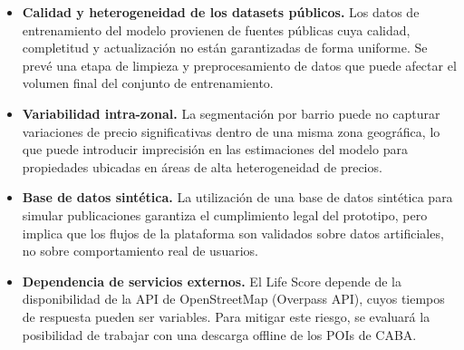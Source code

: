 \begin{itemize}
\item \textbf{Calidad y heterogeneidad de los datasets públicos.} Los datos de entrenamiento del modelo provienen de fuentes públicas cuya calidad, completitud y actualización no están garantizadas de forma uniforme. Se prevé una etapa de limpieza y preprocesamiento de datos que puede afectar el volumen final del conjunto de entrenamiento.
\item \textbf{Variabilidad intra-zonal.} La segmentación por barrio puede no capturar variaciones de precio significativas dentro de una misma zona geográfica, lo que puede introducir imprecisión en las estimaciones del modelo para propiedades ubicadas en áreas de alta heterogeneidad de precios.
\item \textbf{Base de datos sintética.} La utilización de una base de datos sintética para simular publicaciones garantiza el cumplimiento legal del prototipo, pero implica que los flujos de la plataforma son validados sobre datos artificiales, no sobre comportamiento real de usuarios.
\item \textbf{Dependencia de servicios externos.} El Life Score depende de la disponibilidad de la API de OpenStreetMap (Overpass API), cuyos tiempos de respuesta pueden ser variables. Para mitigar este riesgo, se evaluará la posibilidad de trabajar con una descarga offline de los POIs de CABA.
\end{itemize}
